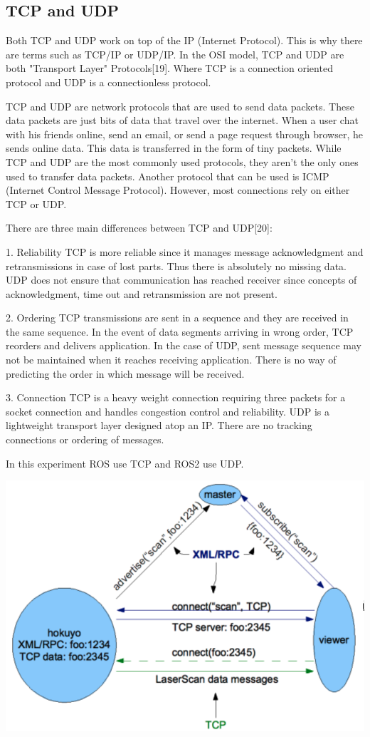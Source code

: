 \documentclass{mproj}
\begin{document}
\subsection{TCP and UDP}
Both TCP and UDP work on top of the IP (Internet Protocol). This is why there are terms such as TCP/IP or UDP/IP. In the OSI model, TCP and UDP are both "Transport Layer" Protocols[19]. Where TCP is a connection oriented protocol and UDP is a connectionless protocol.  

TCP and UDP are network protocols that are used to send data packets. These data packets are just bits of data that travel over the internet. When a user chat with his friends online, send an email, or send a page request through browser, he sends online data. This data is transferred in the form of tiny packets. While TCP and UDP are the most commonly used protocols, they aren’t the only ones used to transfer data packets. Another protocol that can be used is ICMP (Internet Control Message Protocol). However, most connections rely on either TCP or UDP.

There are three main differences between TCP and UDP[20]:

1. Reliability
TCP is more reliable since it manages message acknowledgment and retransmissions in case of lost parts. Thus there is absolutely no missing data. UDP does not ensure that communication has reached receiver since concepts of acknowledgment, time out and retransmission are not present.

2. Ordering
TCP transmissions are sent in a sequence and they are received in the same sequence. In the event of data segments arriving in wrong order, TCP reorders and delivers application. In the case of UDP, sent message sequence may not be maintained when it reaches receiving application. There is no way of predicting the order in which message will be received.

3. Connection
TCP is a heavy weight connection requiring three packets for a socket connection and handles congestion control and reliability. UDP is a lightweight transport layer designed atop an IP. There are no tracking connections or ordering of messages.

In this experiment ROS use TCP and ROS2 use UDP.

\includegraphics[width = .7\textwidth]{d.png}
\end{document}
